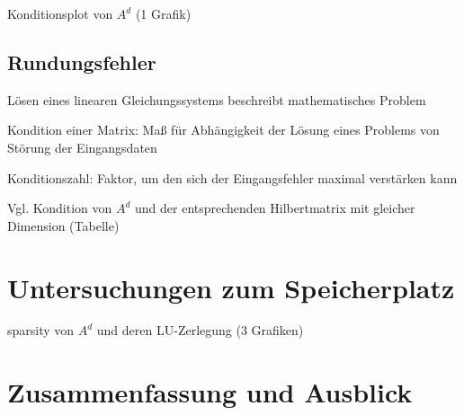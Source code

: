 \documentclass{scrartcl}
\begin{document}
Konditionsplot von $A^d$ (1 Grafik)

\subsection{Rundungsfehler}
Lösen eines linearen Gleichungssystems beschreibt mathematisches Problem

Kondition einer Matrix: Maß für Abhängigkeit der Lösung eines Problems von Störung der Eingangsdaten

Konditionszahl: Faktor, um den sich der Eingangsfehler maximal verstärken kann

Vgl. Kondition von $A^d$ und der entsprechenden Hilbertmatrix mit gleicher Dimension (Tabelle)

\pagebreak
\section{Untersuchungen zum Speicherplatz}
sparsity von $A^d$ und deren LU-Zerlegung (3 Grafiken)

\pagebreak
\section{Zusammenfassung und Ausblick}


\pagebreak



\end{document}
